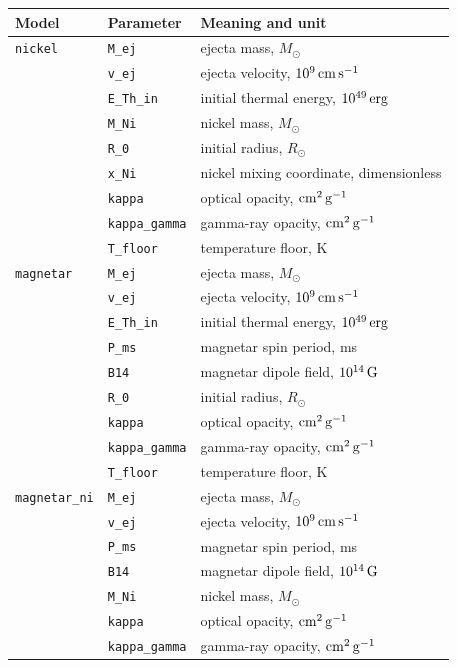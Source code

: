 \documentclass[11pt]{article}
\begin{document}
\begin{longtable}{lll}
\toprule
Model & Parameter & Meaning and unit \\
\midrule
\endhead
\texttt{nickel} & \texttt{M\_ej} & ejecta mass, $M_\odot$ \\
 & \texttt{v\_ej} & ejecta velocity, $10^9\,{\rm cm\,s^{-1}}$ \\
 & \texttt{E\_Th\_in} & initial thermal energy, $10^{49}\,{\rm erg}$ \\
 & \texttt{M\_Ni} & nickel mass, $M_\odot$ \\
 & \texttt{R\_0} & initial radius, $R_\odot$ \\
 & \texttt{x\_Ni} & nickel mixing coordinate, dimensionless \\
 & \texttt{kappa} & optical opacity, ${\rm cm^2\,g^{-1}}$ \\
 & \texttt{kappa\_gamma} & gamma-ray opacity, ${\rm cm^2\,g^{-1}}$ \\
 & \texttt{T\_floor} & temperature floor, K \\
\midrule
\texttt{magnetar} & \texttt{M\_ej} & ejecta mass, $M_\odot$ \\
 & \texttt{v\_ej} & ejecta velocity, $10^9\,{\rm cm\,s^{-1}}$ \\
 & \texttt{E\_Th\_in} & initial thermal energy, $10^{49}\,{\rm erg}$ \\
 & \texttt{P\_ms} & magnetar spin period, ms \\
 & \texttt{B14} & magnetar dipole field, $10^{14}\,{\rm G}$ \\
 & \texttt{R\_0} & initial radius, $R_\odot$ \\
 & \texttt{kappa} & optical opacity, ${\rm cm^2\,g^{-1}}$ \\
 & \texttt{kappa\_gamma} & gamma-ray opacity, ${\rm cm^2\,g^{-1}}$ \\
 & \texttt{T\_floor} & temperature floor, K \\
\midrule
\texttt{magnetar\_ni} & \texttt{M\_ej} & ejecta mass, $M_\odot$ \\
 & \texttt{v\_ej} & ejecta velocity, $10^9\,{\rm cm\,s^{-1}}$ \\
 & \texttt{P\_ms} & magnetar spin period, ms \\
 & \texttt{B14} & magnetar dipole field, $10^{14}\,{\rm G}$ \\
 & \texttt{M\_Ni} & nickel mass, $M_\odot$ \\
 & \texttt{kappa} & optical opacity, ${\rm cm^2\,g^{-1}}$ \\
 & \texttt{kappa\_gamma} & gamma-ray opacity, ${\rm cm^2\,g^{-1}}$ \\

\end{longtable}
\end{document}
